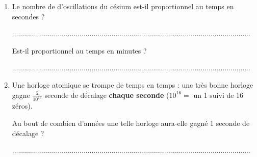 \documentclass[a4paper,11pt]{article}
\begin{document}
\begin{enumerate}
	\item Le nombre de d'oscillations du césium est-il proportionnel au temps en secondes ? \vspace{0.6em}

	      ........................................................................................................................

	      Est-il proportionnel au temps en minutes ? \vspace{0.6em}

	      ........................................................................................................................
	\item Une horloge atomique se trompe de temps en temps : une très bonne horloge gagne $\frac{2}{10^{16}}$ seconde de décalage \textbf{chaque seconde} ($10^{16} = $ un 1 suivi de 16 zéros).

	      Au bout de combien d'années une telle horloge aura-elle gagné 1 seconde de décalage ? \vspace{0.6em}

	      ........................................................................................................................
\end{enumerate}
\end{document}
